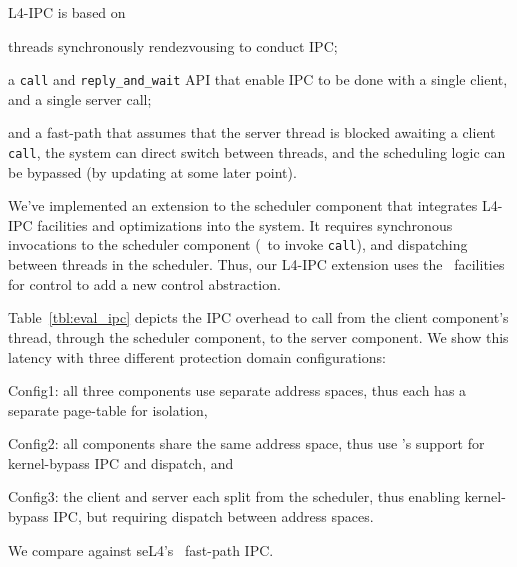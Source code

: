 L4-IPC is based on
\begin{inparaenum}[(1)]
\item threads synchronously rendezvousing to conduct IPC;
\item a {\tt call} and {\tt reply\_and\_wait} API that enable IPC to be done with a single client, and a single server call;
\item and a fast-path that assumes that the server thread is blocked awaiting a client {\tt call}, the system can direct switch between threads, and the scheduling logic can be bypassed (by updating at some later point).
\end{inparaenum}
We've implemented an extension to the scheduler component that integrates L4-IPC facilities and optimizations into the system.
It requires synchronous invocations to the scheduler component (\eg\ to invoke {\tt call}), and dispatching between threads in the scheduler.
Thus, our L4-IPC extension uses the \name\ facilities for control to add a new control abstraction.

Table~\ref{tbl:eval_ipc} depicts the IPC overhead to call from the client component's thread, through the scheduler component, to the server component.
We show this latency with three different protection domain configurations:
\begin{inparaenum}[(1)]
\item Config1: all three components use separate address spaces, thus each has a separate page-table for isolation,
\item Config2: all components share the same address space, thus use \name's support for kernel-bypass IPC and dispatch, and
\item Config3: the client and server each split from the scheduler, thus enabling kernel-bypass IPC, but requiring dispatch between address spaces.
\end{inparaenum}
We compare against seL4's~\cite{sel4} fast-path IPC.


